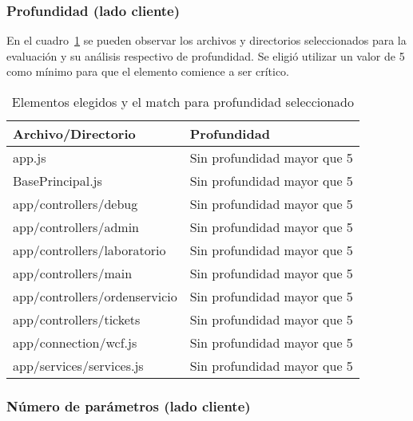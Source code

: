 \documentclass[letterpaper]{article}
\begin{document}
\subsubsection{Profundidad (lado cliente)}
En el cuadro~\ref{table:depth} se pueden observar los archivos y directorios 
seleccionados para la evaluación y su análisis respectivo de profundidad. Se 
eligió utilizar un valor de 5 como mínimo para que el 
elemento comience a ser crítico.
\begin{table}
    \centering
\tiny
    \begin{tabular}{|l|l|}
    \hline
    \textbf{Archivo/Directorio}            & \textbf{Profundidad}                 \\ \hline
    app.js                        & Sin profundidad mayor que 5 \\ \hline
    BasePrincipal.js              & Sin profundidad mayor que 5 \\ \hline
    app/controllers/debug         & Sin profundidad mayor que 5 \\ \hline
    app/controllers/admin         & Sin profundidad mayor que 5 \\ \hline
    app/controllers/laboratorio   & Sin profundidad mayor que 5 \\ \hline
    app/controllers/main          & Sin profundidad mayor que 5 \\ \hline
    app/controllers/ordenservicio & Sin profundidad mayor que 5 \\ \hline
    app/controllers/tickets       & Sin profundidad mayor que 5 \\ \hline
    app/connection/wcf.js         & Sin profundidad mayor que 5 \\ \hline
    app/services/services.js      & Sin profundidad mayor que 5 \\ \hline
    \end{tabular}
    \caption{Elementos elegidos y el match para profundidad seleccionado}
    \label{table:depth}
\end{table}
\subsubsection{Número de parámetros (lado cliente)}
\end{document}
